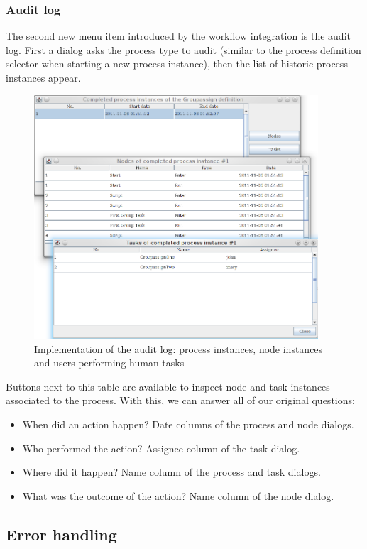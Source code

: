 \subsubsection*{Audit log}

The second new menu item introduced by the workflow integration is the audit
log. First a dialog asks the process type to audit (similar to the process
definition selector when starting a new process instance), then the list of
historic process instances appear.

\begin{figure}[H]
\centering
\includegraphics[width=400px,keepaspectratio]{implementation-auditlog.png}
\caption{Implementation of the audit log: process instances, node instances and users performing human tasks}
\label{fig:implementation-auditlog}
\end{figure}

Buttons next to this table are available to inspect node and task instances
associated to the process. With this, we can answer all of our original
questions:

\begin{itemize}
\item When did an action happen? Date columns of the process and node dialogs.
\item Who performed the action? Assignee column of the task dialog.
\item Where did it happen? Name column of the process and task dialogs.
\item What was the outcome of the action? Name column of the node dialog.
\end{itemize}

\subsection{Error handling}

